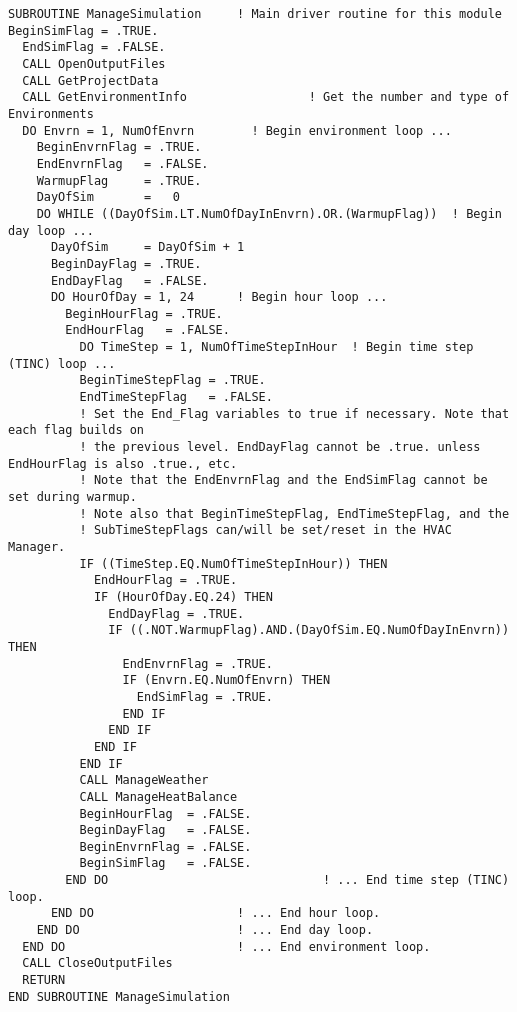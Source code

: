 \begin{lstlisting}
SUBROUTINE ManageSimulation     ! Main driver routine for this module
BeginSimFlag = .TRUE.
  EndSimFlag = .FALSE.
  CALL OpenOutputFiles
  CALL GetProjectData
  CALL GetEnvironmentInfo                 ! Get the number and type of Environments
  DO Envrn = 1, NumOfEnvrn        ! Begin environment loop ...
    BeginEnvrnFlag = .TRUE.
    EndEnvrnFlag   = .FALSE.
    WarmupFlag     = .TRUE.
    DayOfSim       =   0
    DO WHILE ((DayOfSim.LT.NumOfDayInEnvrn).OR.(WarmupFlag))  ! Begin day loop ...
      DayOfSim     = DayOfSim + 1
      BeginDayFlag = .TRUE.
      EndDayFlag   = .FALSE.
      DO HourOfDay = 1, 24      ! Begin hour loop ...
        BeginHourFlag = .TRUE.
        EndHourFlag   = .FALSE.
          DO TimeStep = 1, NumOfTimeStepInHour  ! Begin time step (TINC) loop ...
          BeginTimeStepFlag = .TRUE.
          EndTimeStepFlag   = .FALSE.
          ! Set the End_Flag variables to true if necessary. Note that each flag builds on
          ! the previous level. EndDayFlag cannot be .true. unless EndHourFlag is also .true., etc.
          ! Note that the EndEnvrnFlag and the EndSimFlag cannot be set during warmup.
          ! Note also that BeginTimeStepFlag, EndTimeStepFlag, and the
          ! SubTimeStepFlags can/will be set/reset in the HVAC Manager.
          IF ((TimeStep.EQ.NumOfTimeStepInHour)) THEN
            EndHourFlag = .TRUE.
            IF (HourOfDay.EQ.24) THEN
              EndDayFlag = .TRUE.
              IF ((.NOT.WarmupFlag).AND.(DayOfSim.EQ.NumOfDayInEnvrn)) THEN
                EndEnvrnFlag = .TRUE.
                IF (Envrn.EQ.NumOfEnvrn) THEN
                  EndSimFlag = .TRUE.
                END IF
              END IF
            END IF
          END IF
          CALL ManageWeather
          CALL ManageHeatBalance
          BeginHourFlag  = .FALSE.
          BeginDayFlag   = .FALSE.
          BeginEnvrnFlag = .FALSE.
          BeginSimFlag   = .FALSE.
        END DO                              ! ... End time step (TINC) loop.
      END DO                    ! ... End hour loop.
    END DO                      ! ... End day loop.
  END DO                        ! ... End environment loop.
  CALL CloseOutputFiles
  RETURN
END SUBROUTINE ManageSimulation
\end{lstlisting}
